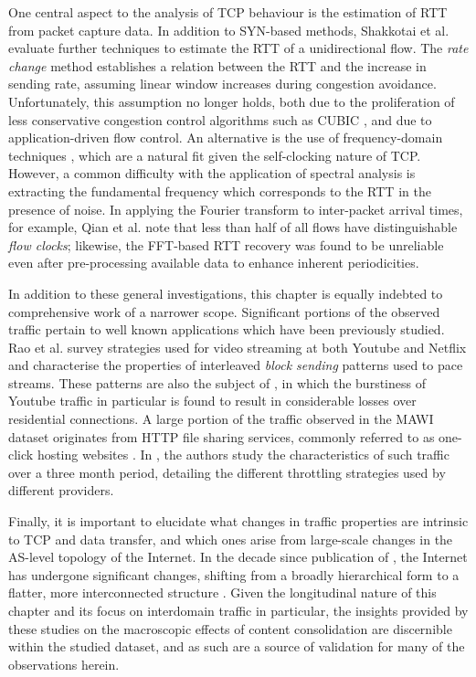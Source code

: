 One central aspect to the analysis of \ac{TCP} behaviour is the estimation of \ac{RTT} from packet capture data. 
In addition to SYN-based methods, Shakkotai et al. \cite{Shakkottai:2004p408} evaluate further techniques to estimate the \ac{RTT} of a unidirectional flow. 
The \textit{rate change} method establishes a relation between the \ac{RTT} and the increase in sending rate, assuming linear window increases during congestion avoidance. 
Unfortunately, this assumption no longer holds, both due to the proliferation of less conservative congestion control algorithms such as CUBIC \cite{Ha:2008p471}, and due to application-driven flow control. 
An alternative is the use of frequency-domain techniques \cite{Veal:2005p412,Lance:2005p565,Qian:2009p429}, which are a natural fit given the self-clocking nature of \ac{TCP}. 
However, a common difficulty with the application of spectral analysis is extracting the fundamental frequency which corresponds to the \ac{RTT} in the presence of noise. 
In applying the Fourier transform to inter-packet arrival times, for example, Qian et al. \cite{Qian:2009p429} note that less than half of all flows have distinguishable \textit{flow clocks}; likewise, the \ac{FFT}-based \ac{RTT} recovery was found to be unreliable even after pre-processing available data to enhance inherent periodicities.

In addition to these general investigations, this chapter is equally indebted to comprehensive work of a narrower scope.
Significant portions of the observed traffic pertain to well known applications which have been previously studied.
Rao et al. \cite{Rao:2011p547} survey strategies used for video streaming at both Youtube and Netflix and characterise the properties of interleaved \emph{block sending} patterns used to pace streams.
These patterns are also the subject of \cite{Alcock:2011p575}, in which the burstiness of Youtube traffic in particular is found to result in considerable losses over residential connections.
A large portion of the traffic observed in the \ac{MAWI} dataset originates from \ac{HTTP} file sharing services, commonly referred to as one-click hosting websites \cite{oneclick1}.
In \cite{SanjuasCuxart:2012p588}, the authors study the characteristics of such traffic over a three month period, detailing the different throttling strategies used by different providers.

Finally, it is important to elucidate what changes in traffic properties are intrinsic to \ac{TCP} and data transfer, and which ones arise from large-scale changes in the \ac{AS}-level topology of the Internet. 
In the decade since publication of \cite{Zhang:2002p85}, the Internet has undergone significant changes, shifting from a broadly hierarchical form to a flatter, more interconnected structure \cite{Labovitz:2010p175,Ager:2012p567}.
Given the longitudinal nature of this chapter and its focus on interdomain traffic in particular, the insights provided by these studies on the macroscopic effects of content consolidation are discernible within the studied dataset, and as such are a source of validation for many of the observations herein.

